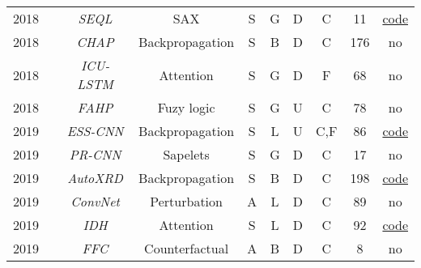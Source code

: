 \begin{table*}[H]
\begin{tabular}{@{}cccccccccc@{}}
    2018        & \cite{nguyen_interpretable_2018}&\textit{SEQL}&SAX        &S       & G        & D      & C                    & 11                & \href{https://github.com/lnthach/Mr-SEQL}{code}\\ 

    2018        & \cite{cho_interpretation_2020}   &\textit{CHAP}      & Backpropagation     & S      & B          & D      & C                           & 176               & no\\

    2018        & \cite{ge_interpretable_2018}      &\textit{\footnotesize{ICU-LSTM}}  & Attention     &S       & G        & D      & F                        & 68                & no \\  

    2018        & \cite{el-sappagh_ontology-based_2018}   & \textit{FAHP}     & Fuzy logic    &S       & G        & U      & C                    & 78                & no\\ 

    2019        &   \cite{ismail_fawaz_accurate_2019}  & \textit{\footnotesize{ESS-CNN}}  & Backpropagation     &S       & L         & U   & C,F                    & 86                & \href{https://github.com/hfawaz/ijcars19}{code}\\ 

    2019        &  \cite{wang_learning_2019}      &\textit{PR-CNN} & Sapelets      &S       & G        & D      & C                    & 17                & no\\ 

    2019        &   \cite{oviedo_fast_2019}    & \textit{AutoXRD}  & Backpropagation     &S       & B          & D      & C                    & 198               & \href{https://github.com/PV-Lab/autoXRD/tree/master}{code}\\ 

    2019        & \cite{kashiparekh_convtimenet_2019}&\textit{ConvNet}& Perturbation  &A       & L         & D      & C                    & 89                & no \\ 

    2019        & \cite{choi_fully_2021}               &\textit{IDH}& Attention   &S       & L         & D      & C                                 & 92                & \href{https://github.com/yoonchoi-neuro/automated_hybrid_IDH}{code}\\  

    2019        & \cite{tonekaboni_explaining_2019}&\textit{FFC}& Counterfactual&A    & B          & D      & C                           & 8                & no \\ 


\end{tabular}
\end{table*}
